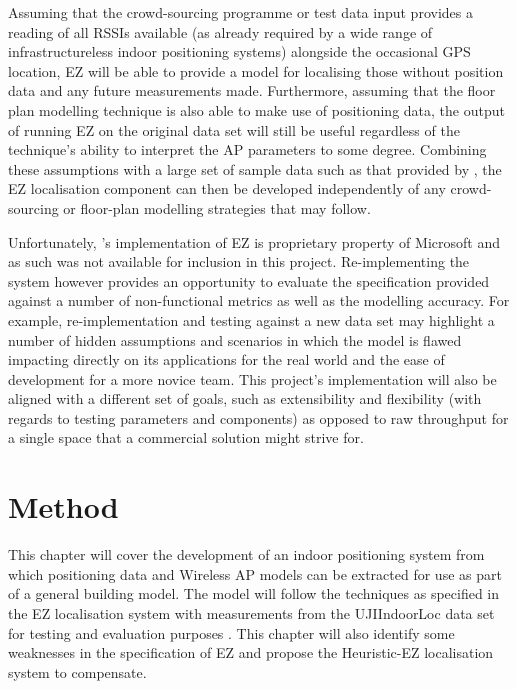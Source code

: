 \documentclass{UoYCSproject}
\begin{document}
        Assuming that the crowd-sourcing programme or test data input provides a reading of all RSSIs available (as already required by a wide range of infrastructureless indoor positioning systems) alongside the occasional GPS location, EZ will be able to provide a model for localising those without position data and any future measurements made. Furthermore, assuming that the floor plan modelling technique is also able to make use of positioning data, the output of running EZ on the original data set will still be useful regardless of the technique's ability to interpret the AP parameters to some degree. Combining these assumptions with a large set of sample data such as that provided by \citet{torres2014ujiindoorloc}, the EZ localisation component can then be developed independently of any crowd-sourcing or floor-plan modelling strategies that may follow.
        
        Unfortunately, \citeauthor{chintalapudi2010indoor}'s implementation of EZ is proprietary property of Microsoft and as such was not available for inclusion in this project. Re-implementing the system however provides an opportunity to evaluate the specification provided against a number of non-functional metrics as well as the modelling accuracy. For example, re-implementation and testing against a new data set may highlight a number of hidden assumptions and scenarios in which the model is flawed impacting directly on its applications for the real world and the ease of development for a more novice team. This project's implementation will also be aligned with a different set of goals, such as extensibility and flexibility (with regards to testing parameters and components) as opposed to raw throughput for a single space that a commercial solution might strive for.
 
	\chapter{Method}
    \label{chap:method}
	
		This chapter will cover the development of an indoor positioning system from which positioning data and Wireless AP models can be extracted for use as part of a general building model. The  model will follow the techniques as specified in the EZ localisation system \citep{chintalapudi2010indoor} with measurements from the UJIIndoorLoc data set for testing and evaluation purposes \citep{torres2014ujiindoorloc}. This chapter will also identify some weaknesses in the specification of EZ and propose the Heuristic-EZ localisation system to compensate.
		
\end{document}
